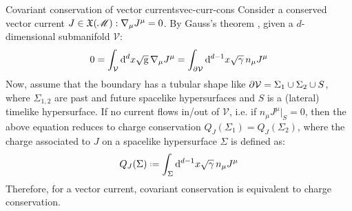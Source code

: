\begin{observation}{Covariant conservation of vector currents}{vec-curr-cons}
  Consider a conserved vector current $ J \in \mathfrak{X}(\mathscr{M}) : \nabla_\mu J^\mu = 0 $. By Gauss's theorem , given a $ d $-dimensional submanifold $ \mathcal{V} $:
  \begin{equation*}
    0 = \int_\mathcal{V} \mathrm{d}^dx \sqrt{\mathrm{g}} \, \nabla_\mu J^\mu = \int_{\partial \mathcal{V}} \mathrm{d}^{d-1}x \sqrt{\gamma} \, n_\mu J^\mu
  \end{equation*}
  Now, assume that the boundary has a tubular shape like $ \partial \mathcal{V} = \Sigma_1 \cup \Sigma_2 \cup S $, where $ \Sigma_{1,2} $ are past and future spacelike hypersurfaces and $ S $ is a (lateral) timelike hypersurface. If no current flows in/out of $ \mathcal{V} $, i.e. if $ n_\mu J^\mu \vert_S = 0 $, then the above equation reduces to charge conservation $ Q_J(\Sigma_1) = Q_J(\Sigma_2) $, where the charge associated to $ J $ on a spacelike hypersurface $ \Sigma $ is defined as:
  \begin{equation}
    Q_J(\Sigma) \defeq \int_\Sigma \dd^{d-1}x \sqrt{\gamma} \, n_\mu J^\mu
  \end{equation}
  Therefore, for a vector current, covariant conservation is equivalent to charge conservation.
\end{observation}

